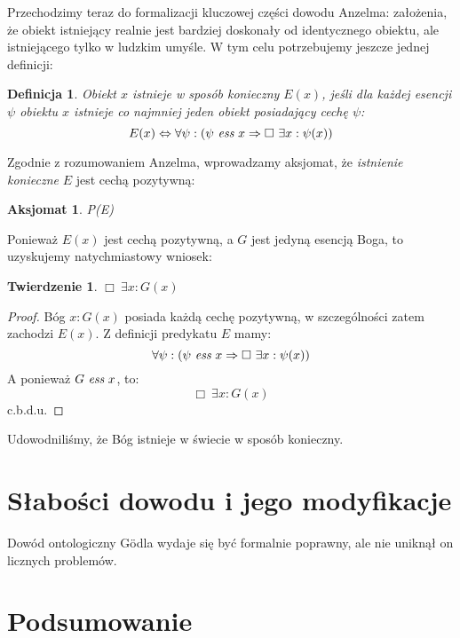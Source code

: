 \documentclass{article}
\newtheorem{axiom-g}{Aksjomat}
\newtheorem{definition-g}{Definicja}
\newtheorem{theorem-g}{Twierdzenie}
\begin{document}
Przechodzimy teraz do formalizacji kluczowej części dowodu Anzelma: założenia, że obiekt istniejący realnie jest bardziej doskonały od identycznego obiektu, ale istniejącego tylko w ludzkim umyśle. W tym celu potrzebujemy jeszcze jednej definicji:
\begin{definition-g}
	Obiekt $x$ istnieje w sposób konieczny $E(x)$, jeśli dla każdej esencji $\psi$ obiektu $x$ istnieje co najmniej jeden obiekt posiadający cechę $\psi$:
	\begin{equation*}
	E(x) \Leftrightarrow \forall \psi: \left( \psi\ \emph{ess}\ x \Rightarrow\Box\ \exists x: \psi(x) \right)
	\end{equation*}
\end{definition-g}
Zgodnie z rozumowaniem Anzelma, wprowadzamy aksjomat, że \emph{istnienie konieczne} $E$ jest cechą pozytywną:
\begin{axiom-g}
	P(E)
\end{axiom-g}
Ponieważ $E(x)$ jest cechą pozytywną, a $G$ jest jedyną esencją Boga, to uzyskujemy natychmiastowy wniosek:
\begin{theorem-g}
	$\Box\ \exists x: G(x)$
\end{theorem-g}
\begin{proof}
	Bóg $x: G(x)$ posiada każdą cechę pozytywną, w szczególności zatem zachodzi $E(x)$. Z definicji predykatu $E$ mamy: 
	\begin{equation*}
	 \forall \psi: \left( \psi\ \emph{ess}\ x \Rightarrow\Box\ \exists x: \psi(x) \right)
	\end{equation*}
	A ponieważ $G\ \emph{ess}\ x$, to:
	\begin{equation*}
	\Box\ \exists x: G(x)
	\end{equation*}
	c.b.d.u.
\end{proof}
Udowodniliśmy, że Bóg istnieje w świecie w sposób konieczny. 

\section{Słabości dowodu i jego modyfikacje} \label{sec:anderson-proof}
Dowód ontologiczny Gödla wydaje się być formalnie poprawny, ale nie uniknął on licznych problemów. 



\section{Podsumowanie}
\end{document}
